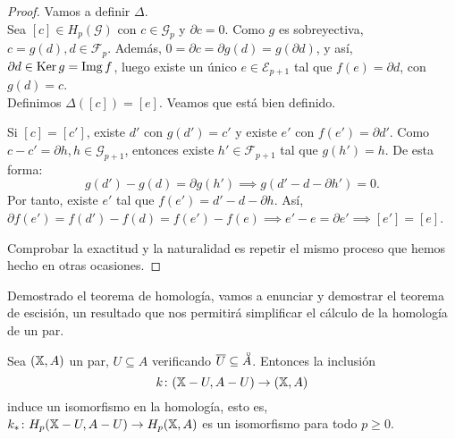 \begin{proof}
  Vamos a definir $\Delta$. \\
  Sea $[c] \in H_p(\mathcal G)$ con $c \in \mathcal G_p$ y $\partial c = 0$. Como $g$ es sobreyectiva, $c = g(d), d \in \mathcal F_p$.
  Además, $0 = \partial c = \partial g(d) = g(\partial d)$, y así, $\partial d \in \operatorname{Ker} g = \operatorname{Img} f$, luego existe un único $e \in \mathcal E_{p+1}$
  tal que $f(e) = \partial d$, con $g(d) = c$. \\
  Definimos $\Delta([c]) = [e]$. Veamos que está bien definido.

  Si $[c] = [c']$, existe $d'$ con $g(d') = c'$ y existe $e'$ con $f(e') = \partial d'$. Como $c - c' = \partial h, h \in \mathcal G_{p+1}$,
  entonces existe $h' \in \mathcal F_{p+1}$ tal que $g(h') = h$. De esta forma:
  \[ g(d') - g(d) = \partial g(h') \implies g(d' - d - \partial h') = 0. \]
  Por tanto, existe $e'$ tal que $f(e') = d' - d - \partial h$. Así, $\partial f(e') = f(d') - f(d) = f(e') - f(e) \implies e' - e = \partial e'
  \implies [e'] = [e]$.

  Comprobar la exactitud y la naturalidad es repetir el mismo proceso que hemos hecho en otras ocasiones.
\end{proof}

Demostrado el teorema de homología, vamos a enunciar y demostrar el teorema de escisión, un resultado que nos permitirá
simplificar el cálculo de la homología de un par.

\begin{theorem}
  Sea $({\mathbb X}, A)$ un par, $U \subseteq A$ verificando $\overline{U} \subseteq \interior{A}$. Entonces la inclusión
  \[ k \colon ({\mathbb X} - U, A - U) \to ({\mathbb X}, A) \]
  induce un isomorfismo en la homología, esto es, $k_* \colon H_p({\mathbb X} - U, A - U) \to H_p({\mathbb X}, A)$ es un isomorfismo para todo $p \geq 0$.
\end{theorem}

